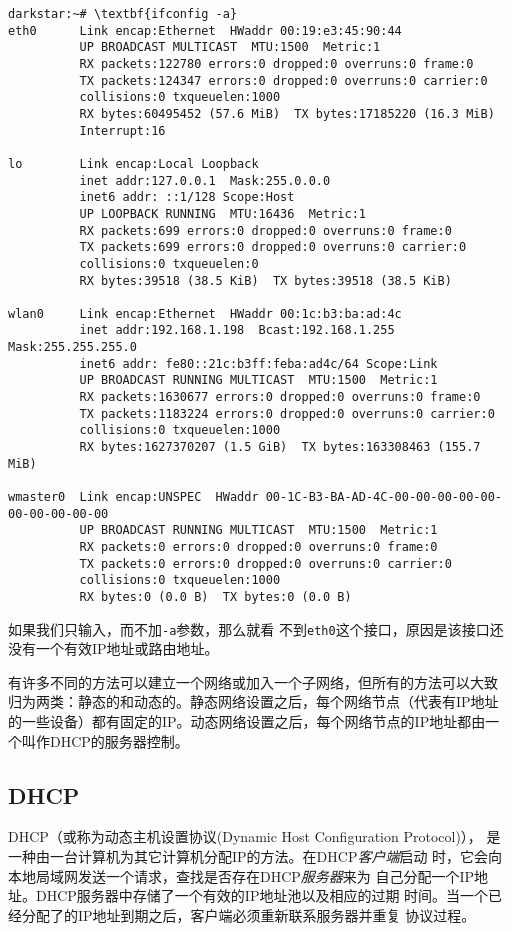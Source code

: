 \begin{Verbatim}[frame=single, commandchars=\\\{\}]
darkstar:~# \textbf{ifconfig -a}
eth0      Link encap:Ethernet  HWaddr 00:19:e3:45:90:44  
          UP BROADCAST MULTICAST  MTU:1500  Metric:1
          RX packets:122780 errors:0 dropped:0 overruns:0 frame:0
          TX packets:124347 errors:0 dropped:0 overruns:0 carrier:0
          collisions:0 txqueuelen:1000 
          RX bytes:60495452 (57.6 MiB)  TX bytes:17185220 (16.3 MiB)
          Interrupt:16 

lo        Link encap:Local Loopback  
          inet addr:127.0.0.1  Mask:255.0.0.0
          inet6 addr: ::1/128 Scope:Host
          UP LOOPBACK RUNNING  MTU:16436  Metric:1
          RX packets:699 errors:0 dropped:0 overruns:0 frame:0
          TX packets:699 errors:0 dropped:0 overruns:0 carrier:0
          collisions:0 txqueuelen:0 
          RX bytes:39518 (38.5 KiB)  TX bytes:39518 (38.5 KiB)

wlan0     Link encap:Ethernet  HWaddr 00:1c:b3:ba:ad:4c  
          inet addr:192.168.1.198  Bcast:192.168.1.255  Mask:255.255.255.0
          inet6 addr: fe80::21c:b3ff:feba:ad4c/64 Scope:Link
          UP BROADCAST RUNNING MULTICAST  MTU:1500  Metric:1
          RX packets:1630677 errors:0 dropped:0 overruns:0 frame:0
          TX packets:1183224 errors:0 dropped:0 overruns:0 carrier:0
          collisions:0 txqueuelen:1000 
          RX bytes:1627370207 (1.5 GiB)  TX bytes:163308463 (155.7 MiB)

wmaster0  Link encap:UNSPEC  HWaddr 00-1C-B3-BA-AD-4C-00-00-00-00-00-00-00-00-00-00  
          UP BROADCAST RUNNING MULTICAST  MTU:1500  Metric:1
          RX packets:0 errors:0 dropped:0 overruns:0 frame:0
          TX packets:0 errors:0 dropped:0 overruns:0 carrier:0
          collisions:0 txqueuelen:1000 
          RX bytes:0 (0.0 B)  TX bytes:0 (0.0 B) 
\end{Verbatim}

如果我们只输入，而不加\texttt{-a}参数，那么就看
不到\texttt{eth0}这个接口，原因是该接口还没有一个有效IP地址或路由地址。

有许多不同的方法可以建立一个网络或加入一个子网络，但所有的方法可以大致
归为两类：静态的和动态的。静态网络设置之后，每个网络节点（代表有IP地址
的一些设备）都有固定的IP。动态网络设置之后，每个网络节点的IP地址都由一
个叫作DHCP的服务器控制。

\subsection{DHCP}
\label{sec:networkConfiguration:tcpIP:dhcp}
DHCP（或称为动态主机设置协议(Dynamic Host Configuration Protocol)），
是一种由一台计算机为其它计算机分配IP的方法。在DHCP\textit{客户端}启动
时，它会向本地局域网发送一个请求，查找是否存在DHCP\textit{服务器}来为
自己分配一个IP地址。DHCP服务器中存储了一个有效的IP地址池以及相应的过期
时间。当一个已经分配了的IP地址到期之后，客户端必须重新联系服务器并重复
协议过程。

